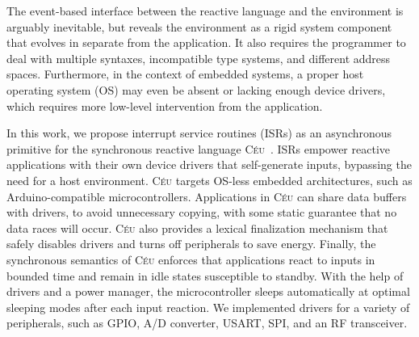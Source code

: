 \documentclass[sigplan,10pt,review,anonymous]{acmart}\settopmatter{printfolios=true,printccs=false,printacmref=false}
\newcommand{\CEU}{\textsc{C\'{e}u}\xspace}
\begin{document}
The event-based interface between the reactive language and the environment is
arguably inevitable,
%
but reveals the environment as a rigid system component
that evolves in separate from the application.
%
It also requires the programmer to deal with multiple
syntaxes, incompatible type systems, and different address spaces.
%
Furthermore, in the context of embedded systems, a proper host operating system (OS) may even be
absent or lacking enough device drivers,
which requires more low-level
intervention from the application.

In this work, we propose interrupt service routines (ISRs) as an asynchronous
primitive for the synchronous reactive language \CEU~\cite{ceu.sensys13}.
ISRs empower reactive applications with their own device drivers that
self-generate inputs, bypassing the need for a host environment.
%
\CEU targets OS-less embedded architectures, such as Arduino-compatible
microcontrollers. %
%
%
Applications in \CEU can share data buffers with drivers, to avoid unnecessary copying,
with some static guarantee that no data races will occur.
%
\CEU also provides a lexical finalization mechanism %
that safely disables drivers and turns off peripherals to save energy.
%
Finally, the synchronous semantics of \CEU enforces that applications react
to inputs in bounded time and remain in idle states susceptible to standby.
With the help of drivers and a power manager, the microcontroller
sleeps automatically at optimal sleeping modes after each input reaction.
%
%
We implemented drivers for a variety of peripherals, such as GPIO, A/D
converter, USART, SPI, and an RF transceiver.
%
\end{document}

